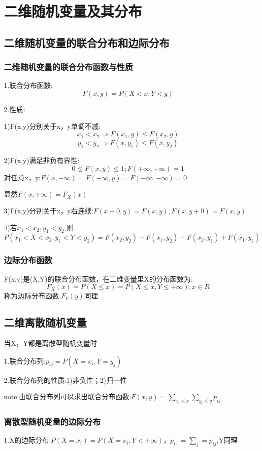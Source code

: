 \documentclass[11pt,twoside,a4paper]{ctexart}
\begin{document}
    \section{二维随机变量及其分布}
    \subsection{二维随机变量的联合分布和边际分布}
    \subsubsection{二维随机变量的联合分布函数与性质}
    1.联合分布函数:
    \[F(x,y) = P(X<x,Y<y)\]

    2.性质:
    \begin{minipage}[t]{0.9\linewidth}
        1)F(x,y)分别关于x，y单调不减:
        \[x_1<x_2  \Rightarrow  F(x_1,y) \leq F(x_2,y) \]
        \[y_1<y_2  \Rightarrow  F(x,y_1) \leq F(x,y_2)  \]

        2)F(x,y)满足非负有界性:
        \[0\leq F(x,y)\leq 1;F(+\infty,+\infty) = 1\]
        对任意x，y:$F(x,-\infty) = F(-\infty,y) = F(-\infty,-\infty) = 0$

        显然$F(x,+\infty) = F_X(x)$

        3)F(x,y)分别关于x，y右连续:$F(x+0,y) = F(x,y),F(x,y+0) = F(x,y) $

        4)若$x_1<x_2,y_1<y_2$,则
        \[P(x_1<X<x_2,y_1<Y<y_2) = F(x_2,y_2) - F(x_1,y_2) - F(x_2,y_1) + F(x_1,y_1)\]
    \end{minipage}

    \subsubsection{边际分布函数}
    F(x,y)是(X,Y)的联合分布函数，在二维变量里X的分布函数为:
    \[F_X(x) = P(X\leq x) =P(X\leq x,Y\leq +\infty); x\in R\]
    称为边际分布函数,$F_Y(y)$同理

    \subsection{二维离散随机变量}
    当X，Y都是离散型随机变量时
    
    1.联合分布列:$p_{ij} = P(X = x_i,Y = y_j)$

    2.联合分布列的性质:1)非负性；2)归一性

    note:由联合分布列可以求出联合分布函数:$F(x,y) = \sum _{x_i\leq x}\sum _{y_i\leq y}p_{ij}$
    \subsubsection{离散型随机变量的边际分布}
    1.X的边际分布:$P(X = x_i) = P(X = x_i,Y < +\infty)，p_{i\cdot} = \sum _j = p_{ij}$,Y同理
\end{document}
